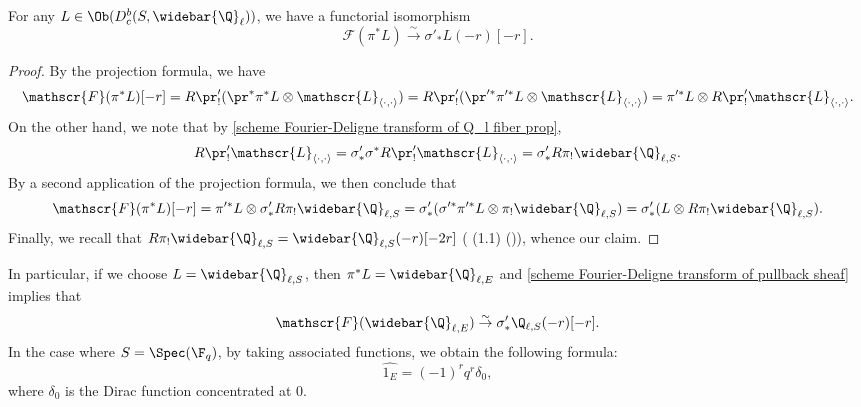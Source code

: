 \begin{proposition}\label{scheme Fourier-Deligne transform of pullback sheaf}
For any $L\in \Ob(D^b_c(S,\widebar{\Q}_\ell))$, we have a functorial isomorphism
\[\mathscr{F}(\pi^*L)\stackrel{\sim}{\to}\sigma'_*L(-r)[-r].\]
\end{proposition}
\begin{proof}
By the projection formula, we have
\[\mathscr{F}(\pi^*L)[-r]=R\pr'_!(\pr^*\pi^*L\otimes\mathscr{L}_{\langle\cdot,\cdot\rangle})=R\pr'_!(\pr'^*\pi'^*L\otimes\mathscr{L}_{\langle\cdot,\cdot\rangle})=\pi'^*L\otimes R\pr'_!\mathscr{L}_{\langle\cdot,\cdot\rangle}.\]
On the other hand, we note that by \cref{scheme Fourier-Deligne transform of Q_l fiber prop},
\[R\pr'_!\mathscr{L}_{\langle\cdot,\cdot\rangle}=\sigma'_*\sigma^*R\pr'_!\mathscr{L}_{\langle\cdot,\cdot\rangle}=\sigma'_*R\pi_!\widebar{\Q}_{\ell,S}.\]
By a second application of the projection formula, we then conclude that
\[\mathscr{F}(\pi^*L)[-r]=\pi'^*L\otimes\sigma'_*R\pi_!\widebar{\Q}_{\ell,S}=\sigma'_*(\sigma'^*\pi'^*L\otimes\pi_!\widebar{\Q}_{\ell,S})=\sigma'_*(L\otimes R\pi_!\widebar{\Q}_{\ell,S}).\]
Finally, we recall that $R\pi_!\widebar{\Q}_{\ell,S}=\widebar{\Q}_{\ell,S}(-r)[-2r]$ (\cite{SGA5}  (1.1) ()), whence our claim.
\end{proof}

\begin{example}
In particular, if we choose $L=\widebar{\Q}_{\ell,S}$, then $\pi^*L=\widebar{\Q}_{\ell,E}$ and \cref{scheme Fourier-Deligne transform of pullback sheaf} implies that
\begin{equation}\label{scheme Fourier-Deligne transform of Q_l char}
\mathscr{F}(\widebar{\Q}_{\ell,E})\stackrel{\sim}{\to}\sigma'_*\Q_{\ell,S}(-r)[-r].
\end{equation}
In the case where $S=\Spec(\F_q)$, by taking associated functions, we obtain the following formula:
\[\widehat{1_E}=(-1)^rq^r\delta_0,\]
where $\delta_0$ is the Dirac function concentrated at $0$.
\end{example}

